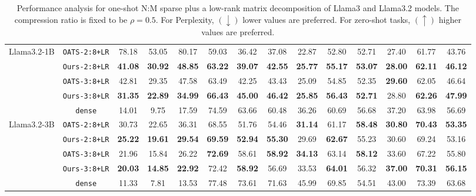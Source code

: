\begin{table}[h!]
{\begin{tabular}{cccccccccccccc}
\midrule
\multirow{5.5}{*}{Llama3.2-1B} 
&\texttt{OATS-2:8+LR}       & 78.18 & 53.05 & 80.17 & 59.03 & 36.42 & 37.08 & 22.87 & 52.80 & 52.71 & 27.40 & 61.77 & 43.76 \\
&\texttt{Ours-2:8+LR}       & \textbf{41.08} & \textbf{30.92} & \textbf{48.85} & \textbf{63.22} & \textbf{39.07} & \textbf{42.55} & \textbf{25.77} & \textbf{55.17} & \textbf{53.07} & \textbf{28.00} & \textbf{62.11} & \textbf{46.12} \\
\cmidrule(rl){2-2}
&\texttt{OATS-3:8+LR}       & 42.81 & 29.35 & 47.58 & 63.49 & 42.25 & 43.43 & 25.09 & 54.85 & 52.35 & \textbf{29.60} & 62.05 & 46.64 \\
&\texttt{Ours-3:8+LR}       & \textbf{31.35} & \textbf{22.89} & \textbf{34.99} & \textbf{66.43} & \textbf{45.00} & \textbf{46.42} & \textbf{25.85} & \textbf{56.43} & \textbf{52.71} & 28.80 & \textbf{62.26} & \textbf{47.99} \\
\cmidrule(rl){2-2}
&\texttt{dense}               & 14.01 & 9.75 & 17.59 & 74.59 & 63.66 & 60.48 & 36.26 & 60.69 & 56.68 & 37.20 & 63.98 & 56.69 \\

\midrule
\multirow{5.5}{*}{Llama3.2-3B} 
&\texttt{OATS-2:8+LR}       & 30.73 & 22.65 & 36.31 & 68.55 & 51.76 & 54.46 & \textbf{31.14} & 61.17 & \textbf{58.48} & \textbf{30.80} & \textbf{70.43} & \textbf{53.35} \\
&\texttt{Ours-2:8+LR}       & \textbf{25.22} & \textbf{19.61} & \textbf{29.54} & \textbf{69.59} & \textbf{52.94} & \textbf{55.30} & 29.69 & \textbf{62.67} & 55.23 & 30.60 & 69.24 & 53.16\\
\cmidrule(rl){2-2}
&\texttt{OATS-3:8+LR}       & 21.96 & 15.84 & 26.22 & \textbf{72.69} & 58.61 & \textbf{58.92} & \textbf{34.13} & 63.14 & \textbf{58.12} & 33.60 & 67.22 & 55.80 \\
&\texttt{Ours-3:8+LR}       & \textbf{20.03} & \textbf{14.85} & \textbf{22.92} & 72.42 & \textbf{58.92} & 56.69 & 33.53 & \textbf{64.01} & 56.32 & \textbf{37.00} & \textbf{70.31} & \textbf{56.15} \\
\cmidrule(rl){2-2}
&\texttt{dense}               & 11.33 & 7.81 & 13.53 & 77.48 & 73.61 & 71.63 & 45.99 & 69.85 & 54.51 & 43.00 & 73.39 & 63.68 \\


\bottomrule
\end{tabular}
}
\vspace{3pt}
\caption{Performance analysis for one-shot N:M sparse plus a low-rank matrix decomposition of Llama3 and Llama3.2 models. The compression ratio is fixed to be $\rho=0.5$. For Perplexity, $(\downarrow)$ lower values are preferred. For zero-shot tasks, $(\uparrow)$ higher values are preferred.}
\label{tab:supp-slr-fixed-compression}
\end{table}

